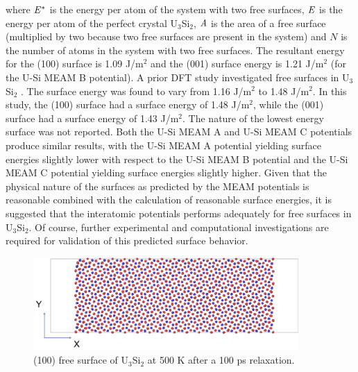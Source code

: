 \documentclass[review]{elsarticle}
\begin{document}
where $\it{E^{*}}$ is the energy per atom of the system with two free surfaces, $\it{E}$ is the energy per atom of the perfect crystal U$_{3}$Si$_{2}$, $\it{A}$ is the area of a free surface (multiplied by two because two free surfaces are present in the system) and $\textit{N}$ is the number of atoms in the system with two free surfaces.  The resultant energy for the (100) surface is 1.09 J/m$^{2}$ and the (001) surface energy is 1.21 J/m$^{2}$ (for the U-Si MEAM B potential).  A prior DFT study investigated free surfaces in U$_{3}$Si$_{2}$ \cite{anl_report}.  The surface energy was found to vary from 1.16 J/m$^{2}$ to 1.48 J/m$^{2}$.  In this study, the (100) surface had a surface energy of 1.48 J/m$^{2}$, while the (001) surface had a surface energy of 1.43 J/m$^{2}$.  The nature of the lowest energy surface was not reported.  Both the U-Si MEAM A and U-Si MEAM C potentials produce similar results, with the U-Si MEAM A potential yielding surface energies slightly lower with respect to the U-Si MEAM B potential and the U-Si MEAM C potential yielding surface energies slightly higher.  Given that the physical nature of the surfaces as predicted by the MEAM potentials is reasonable combined with the calculation of reasonable surface energies, it is suggested that the interatomic potentials performs adequately for free surfaces in U$_{3}$Si$_{2}$.  Of course, further experimental and computational investigations are required for validation of this predicted surface behavior.  

\begin{figure}[bt]
	\centering
	\includegraphics[width=0.9\textwidth]{100surfaceB.png}
    \caption{(100) free surface of U$_{3}$Si$_{2}$ at 500 K after a 100 ps relaxation.}\label{fig:ben7}
\end{figure}
\end{document}
